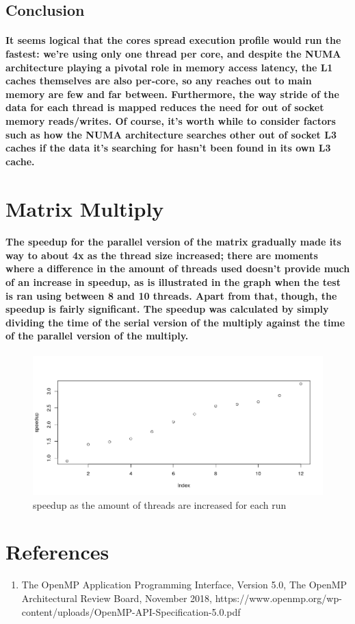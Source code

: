 \documentclass{article}
\begin{document}
\subsection{Conclusion}

\paragraph{It seems logical that the cores spread execution profile would run the fastest: we're using only one thread per core, and despite the NUMA architecture playing a pivotal role in memory access latency, the L1 caches themselves are also per-core, so any reaches out to main memory are few and far between. Furthermore, the way stride of the data for each thread is mapped reduces the need for out of socket memory reads/writes. Of course, it's worth while to consider factors such as how the NUMA architecture searches other out of socket L3 caches if the data it's searching for hasn't been found in its own L3 cache.}


\section{Matrix Multiply}

\paragraph{The speedup for the parallel version of the matrix gradually made its way to about 4x as the thread size increased; there are moments where a difference in the amount of threads used doesn't provide much of an increase in speedup, as is illustrated in the graph when the test is ran using between 8 and 10 threads. Apart from that, though, the speedup is fairly significant. The speedup was calculated by simply dividing the time of the serial version of the multiply against the time of the parallel version of the multiply.}

\begin{figure}
\caption{speedup as the amount of threads are increased for each run}
\centering
\includegraphics[width=\textwidth]{matrix_mul_speedup}
\end{figure}

\section{References}

\begin {enumerate}
\item The OpenMP Application Programming Interface, Version 5.0, The OpenMP Architectural Review Board, November 2018,
  https://www.openmp.org/wp-content/uploads/OpenMP-API-Specification-5.0.pdf
\end{enumerate}
\end{document}
